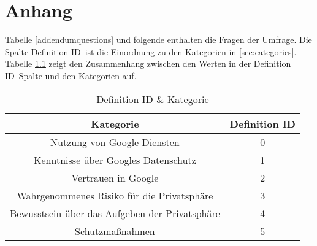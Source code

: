 %
% 

\chapter{Anhang}


Tabelle \ref{addendumquestions} und folgende enthalten die Fragen der Umfrage. Die Spalte \glqq Definition ID\grqq\ ist die Einordnung zu den Kategorien in \ref{sec:categories}. Tabelle \ref{tablecats} zeigt den Zusammenhang zwischen den Werten in der \glqq Definition ID\grqq\ Spalte und den Kategorien auf.

\begin{table}
	\begin{tabular}[]{c | c}
	\hline
	Kategorie & Definition ID\\\hline\hline
	Nutzung von Google Diensten & 0\\\hline
	Kenntnisse über Googles Datenschutz & 1\\\hline
	Vertrauen in Google & 2\\\hline
	Wahrgenommenes Risiko für die Privatsphäre & 3\\\hline
	Bewusstsein über das Aufgeben der Privatsphäre & 4\\\hline
	Schutzmaßnahmen & 5\\\hline	
	\end{tabular}
	\caption{Definition ID \& Kategorie}\label{tablecats}
\end{table}

